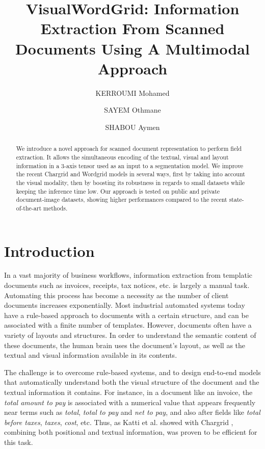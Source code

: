 \documentclass[runningheads]{llncs}
\begin{document}
\title{VisualWordGrid: Information Extraction From Scanned Documents Using A Multimodal Approach}
\author{KERROUMI Mohamed \and
SAYEM Othmane \and
SHABOU Aymen}
\maketitle              \begin{abstract}
We introduce a novel approach for scanned document representation to perform field extraction. 
It allows the simultaneous encoding of the textual, visual and layout information in a  3-axis tensor used as an input to a segmentation model. We improve the recent Chargrid and Wordgrid \cite{chargrid} models in  several ways, first by taking into account the visual modality, then by boosting its robustness in regards to small datasets while keeping the inference time low.
Our approach is tested on public and private document-image datasets, showing higher performances compared to the recent state-of-the-art methods.

\end{abstract}


\section{Introduction}
In a vast majority of business workflows, information extraction from templatic documents such as invoices, receipts, tax notices, etc. is largely a manual task. 
Automating this process has become a necessity as the number of client documents increases exponentially.
Most industrial automated systems today have a rule-based approach to documents with a certain structure, and can be associated with a finite number of templates.
However, documents often have  a variety of layouts and structures. In order to understand the semantic content of these documents, the human brain uses the document's layout, as well as the textual and visual information available in its contents.

The challenge is to overcome rule-based systems, and to design end-to-end models that automatically understand both the visual structure of the document and the textual information it contains. For instance, in a document like an invoice, the \textit{total amount to pay} is associated with a numerical value that appears frequently near terms such as \textit{total}, \textit{total to pay} and \textit{net to pay}, and also after fields like \textit{total before taxes}, \textit{taxes}, \textit{cost}, etc. Thus, as Katti et al. showed with Chargrid \cite{chargrid}, combining both positional and textual information, was proven to be efficient for this task. 
\end{document}
